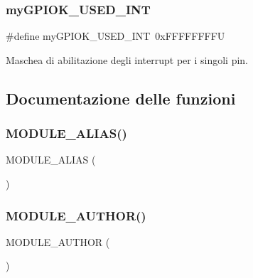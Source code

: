 \subsubsection{\texorpdfstring{my\+G\+P\+I\+O\+K\+\_\+\+U\+S\+E\+D\+\_\+\+I\+NT}{myGPIOK\_USED\_INT}}
{\footnotesize\ttfamily \#define my\+G\+P\+I\+O\+K\+\_\+\+U\+S\+E\+D\+\_\+\+I\+NT~0x\+F\+F\+F\+F\+F\+F\+F\+FU}



Maschea di abilitazione degli interrupt per i singoli pin. 



\subsection{Documentazione delle funzioni}
\mbox{\label{group___linux-_driver_ga1681c4acdb2692baf523dbf58f940399}} 
\subsubsection{\texorpdfstring{M\+O\+D\+U\+L\+E\+\_\+\+A\+L\+I\+A\+S()}{MODULE\_ALIAS()}}
{\footnotesize\ttfamily M\+O\+D\+U\+L\+E\+\_\+\+A\+L\+I\+AS (\begin{DoxyParamCaption}\item[{\hyperlink{group___linux-_driver_ga25634d21648ca7fb7a2aca614bafaaeb}{D\+R\+I\+V\+E\+R\+\_\+\+N\+A\+ME}}]{ }\end{DoxyParamCaption})}

\mbox{\label{group___linux-_driver_gaa528ef168ff30340d38c46a12fce906b}} 
\subsubsection{\texorpdfstring{M\+O\+D\+U\+L\+E\+\_\+\+A\+U\+T\+H\+O\+R()}{MODULE\_AUTHOR()}}
{\footnotesize\ttfamily M\+O\+D\+U\+L\+E\+\_\+\+A\+U\+T\+H\+OR (\begin{DoxyParamCaption}\item[{\char`\"{}Salvatore Barone $<$salvator.\+barone@gmail.\+com$>$\char`\"{}}]{ }\end{DoxyParamCaption})}

